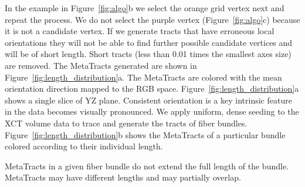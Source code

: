 In the example in Figure~\ref{fig:algo}b we select the orange grid vertex next and repeat the process. We do not select the purple vertex (Figure~\ref{fig:algo}c) because it is not a candidate vertex. If we generate tracts that have erroneous local orientations they will not be able to find further possible candidate vertices and will be of short length. Short tracts (less than 0.01 times the smallest axes size) are removed. The MetaTracts generated are shown in Figure~\ref{fig:length_distribution}a. The MetaTracts are colored with the mean orientation direction mapped to the RGB space. Figure~\ref{fig:length_distribution}a shows a single slice of YZ plane. Consistent orientation is a key intrinsic feature in the data becomes visually pronounced.
We apply uniform, dense seeding to the XCT volume data to trace and generate the tracts of fiber bundles. Figure~\ref{fig:length_distribution}b shows the MetaTracts of a particular bundle colored according to their individual length.

MetaTracts in a given fiber bundle do not extend the full length of the bundle. MetaTracts may have different lengths and may partially overlap.
 
 
%
 

